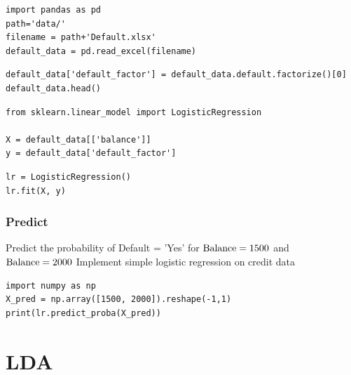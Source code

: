 \begin{frame}[fragile]
\tiny
\begin{lstlisting}
import pandas as pd
path='data/'
filename = path+'Default.xlsx'
default_data = pd.read_excel(filename)
\end{lstlisting}
\pause
\begin{lstlisting}
default_data['default_factor'] = default_data.default.factorize()[0]
default_data.head()
\end{lstlisting}
\pause
\begin{lstlisting}
from sklearn.linear_model import LogisticRegression

X = default_data[['balance']]
y = default_data['default_factor']
\end{lstlisting}

\begin{lstlisting}
lr = LogisticRegression()
lr.fit(X, y)
\end{lstlisting}
\end{frame}

\begin{frame}[fragile]\frametitle{Predict}
Predict the probability of Default = 'Yes' for $\mathrm{Balance} =  1500$ and $\mathrm{Balance} = 2000$
Implement simple logistic regression on credit data 

\pause
{\tiny 
\begin{lstlisting}
import numpy as np
X_pred = np.array([1500, 2000]).reshape(-1,1)
print(lr.predict_proba(X_pred))
\end{lstlisting}}
\end{frame}





\section{LDA}


